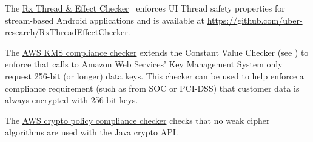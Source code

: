 
The \href{https://plv.colorado.edu/benno/ase18.pdf}{Rx Thread \& Effect Checker}~\cite{SteinCSC2018} enforces
UI Thread safety properties for stream-based Android applications and is available at
\url{https://github.com/uber-research/RxThreadEffectChecker}.



The \href{https://github.com/awslabs/aws-kms-compliance-checker}{AWS KMS
  compliance checker} extends the Constant Value Checker (see
) to enforce that calls to Amazon
Web Services' Key Management System only request 256-bit (or longer) data
keys.  This checker can be used to help enforce a compliance requirement
(such as from SOC or PCI-DSS) that customer data is always encrypted with
256-bit keys.



The
\href{https://github.com/awslabs/aws-crypto-policy-compliance-checker}{AWS
  crypto policy compliance checker} checks that no weak cipher algorithms
are used with the Java crypto API\@.


